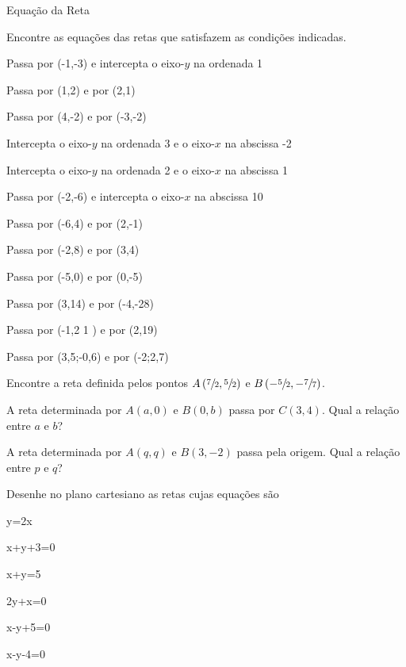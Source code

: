 \begin{exercicios}{Equação da Reta}
    \begin{exercicio}
        Encontre as equações das retas que satisfazem as condições indicadas.
        \begin{alphalist}
            \item Passa por (-1,-3) e intercepta o eixo-$y$ na ordenada 1
            \item Passa por (1,2) e por (2,1)
            \item Passa por (4,-2) e por (-3,-2)
            \item Intercepta o eixo-$y$ na ordenada 3 e o eixo-$x$ na abscissa -2
            \item Intercepta o eixo-$y$ na ordenada 2 e o eixo-$x$ na abscissa 1
            \item Passa por (-2,-6) e intercepta o eixo-$x$ na abscissa 10
            \item Passa por (-6,4) e por (2,-1)
            \item Passa por (-2,8) e por (3,4)
            \item Passa por (-5,0) e por (0,-5)
            \item Passa por (3,14) e por (-4,-28)
            \item Passa por (-1,2 1 ) e por (2,19)
            \item Passa por (3,5;-0,6) e por (-2;2,7)
        \end{alphalist}
    \end{exercicio}
        
    \begin{exercicio}
        Encontre a reta definida pelos pontos 
        \( A\left( \sfrac{7}{2}, \sfrac{5}{2}\right) \) e  
        \( B\left(-\sfrac{5}{2},-\sfrac{7}{7}\right) \).
    \end{exercicio}
        
    \begin{exercicio}
        A reta determinada por $A(a,0)$ e $B(0,b)$ passa por $C(3,4)$. Qual a relação entre $a$ e $b$?
    \end{exercicio}
        
    \begin{exercicio}
        A reta determinada por $A(q,q)$ e $B(3,-2)$ passa pela origem. Qual a relação entre $p$ e $q$?
    \end{exercicio}
    
    \begin{exercicio}
        Desenhe no plano cartesiano as retas cujas equações são
        \begin{mathlist}[2]
            \item y=2x
            \item x+y+3=0
            \item x+y=5
            \item 2y+x=0
            \item x-y+5=0
            \item x-y-4=0
        \end{mathlist}
    \end{exercicio}
    

\end{exercicios}
